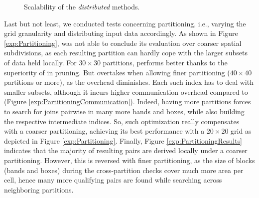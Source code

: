 \begin{figure}[!tb]
 \centering 
 \caption{Scalability of the {\em distributed} methods.}
 \label{exp:scalability}
\end{figure}


Last but not least, we conducted tests concerning partitioning, i.e., varying the grid granularity and distributing input data accordingly. As shown in Figure \ref{exp:Partitioning}, \base was not able to conclude its evaluation over coarser spatial subdivisions, as each resulting partition can hardly cope with the larger subsets of data held locally. For $30 \times 30$ partitions, \opt performs better thanks to  the superiority of \btsr in pruning. But \base overtakes \opt when allowing finer partitioning ($40 \times 40$ partitions or more), as the \rtree overhead diminishes. Each such index has to deal with smaller subsets, although it incurs higher communication overhead compared to \opt (Figure \ref{exp:PartitioningCommunication}). Indeed, having more partitions forces \opt to search for joins pairwise in many more bands and boxes, while also building the respective intermediate indices. So, such optimization really compensates with a coarser partitioning, achieving its best performance with a $20 \times 20$ grid as depicted in Figure \ref{exp:Partitioning}. Finally, Figure \ref{exp:PartitioningResults} indicates that the majority of resulting pairs are derived locally under a coarser partitioning. However, this is reversed with finer partitioning, as the size of blocks (bands and boxes) during the cross-partition checks cover much more area per cell, hence many more qualifying pairs are found while searching across neighboring partitions.

